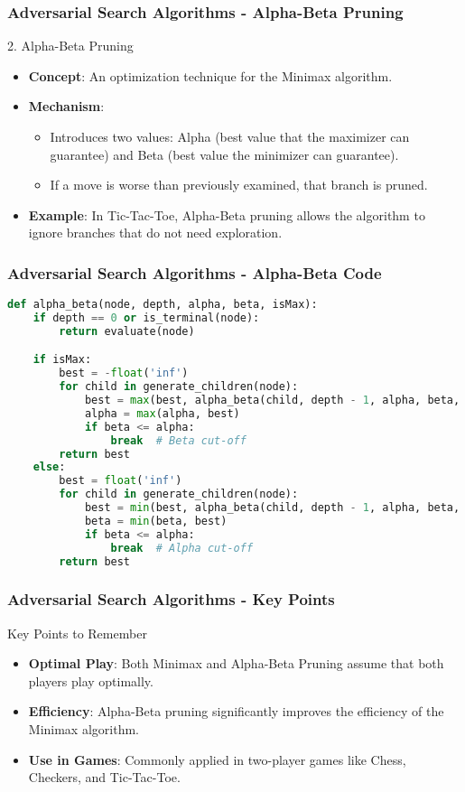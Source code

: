 \documentclass[aspectratio=169]{beamer}
\begin{document}
\begin{frame}[fragile]
    \frametitle{Adversarial Search Algorithms - Alpha-Beta Pruning}
    \begin{block}{2. Alpha-Beta Pruning}
        \begin{itemize}
            \item \textbf{Concept}: An optimization technique for the Minimax algorithm.
            \item \textbf{Mechanism}:
              \begin{itemize}
                  \item Introduces two values: Alpha (best value that the maximizer can guarantee) and Beta (best value the minimizer can guarantee).
                  \item If a move is worse than previously examined, that branch is pruned.
              \end{itemize}
            \item \textbf{Example}: In Tic-Tac-Toe, Alpha-Beta pruning allows the algorithm to ignore branches that do not need exploration.
        \end{itemize}
    \end{block}
\end{frame}

\begin{frame}[fragile]
    \frametitle{Adversarial Search Algorithms - Alpha-Beta Code}
    \begin{lstlisting}[language=Python]
def alpha_beta(node, depth, alpha, beta, isMax):
    if depth == 0 or is_terminal(node):
        return evaluate(node)

    if isMax:
        best = -float('inf')
        for child in generate_children(node):
            best = max(best, alpha_beta(child, depth - 1, alpha, beta, False))
            alpha = max(alpha, best)
            if beta <= alpha:
                break  # Beta cut-off
        return best
    else:
        best = float('inf')
        for child in generate_children(node):
            best = min(best, alpha_beta(child, depth - 1, alpha, beta, True))
            beta = min(beta, best)
            if beta <= alpha:
                break  # Alpha cut-off
        return best
    \end{lstlisting}
\end{frame}

\begin{frame}[fragile]
    \frametitle{Adversarial Search Algorithms - Key Points}
    \begin{block}{Key Points to Remember}
        \begin{itemize}
            \item \textbf{Optimal Play}: Both Minimax and Alpha-Beta Pruning assume that both players play optimally.
            \item \textbf{Efficiency}: Alpha-Beta pruning significantly improves the efficiency of the Minimax algorithm.
            \item \textbf{Use in Games}: Commonly applied in two-player games like Chess, Checkers, and Tic-Tac-Toe.
        \end{itemize}
    \end{block}
\end{frame}
\end{document}
